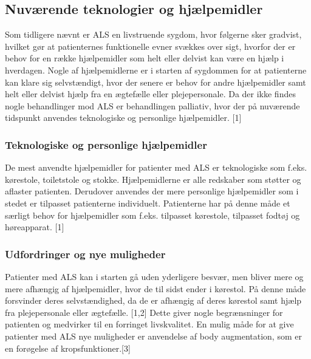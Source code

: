 \subsection{Nuværende teknologier og hjælpemidler}
Som tidligere nævnt er ALS en livstruende sygdom, hvor følgerne sker gradvist, hvilket gør at patienternes funktionelle evner svækkes over sigt, hvorfor der er behov for en række hjælpemidler som helt eller delvist kan være en hjælp i hverdagen. Nogle af hjælpemidlerne er i starten af sygdommen for at patienterne kan klare sig selvstændigt, hvor der senere er behov for andre hjælpemidler samt helt eller delvist hjælp fra en ægtefælle eller plejepersonale. Da der ikke findes nogle behandlinger mod ALS er behandlingen palliativ, hvor der på nuværende tidspunkt anvendes teknologiske og personlige hjælpemidler. [1]

\subsubsection{Teknologiske og personlige hjælpemidler}
De mest anvendte hjælpemidler for patienter med ALS er teknologiske som f.eks.  kørestole, toiletstole og stokke. Hjælpemidlerne er alle redskaber som støtter og aflaster patienten. Derudover anvendes der mere personlige hjælpemidler som i stedet er tilpasset patienterne individuelt. Patienterne har på denne måde et særligt behov for hjælpemidler som f.eks. tilpasset kørestole, tilpasset fodtøj og høreapparat. [1]

\subsubsection{Udfordringer og nye muligheder}
Patienter med ALS kan i starten gå uden yderligere besvær, men bliver mere og mere afhængig af hjælpemidler, hvor de til sidst ender i kørestol. På denne måde forsvinder deres selvstændighed, da de er afhængig af deres kørestol samt hjælp fra plejepersonale eller ægtefælle. [1,2] Dette giver nogle begrænsninger for patienten og medvirker til en forringet livskvalitet. En mulig måde for at give patienter med ALS nye muligheder er anvendelse af body augmentation, som er en forøgelse af kropsfunktioner.[3] 

